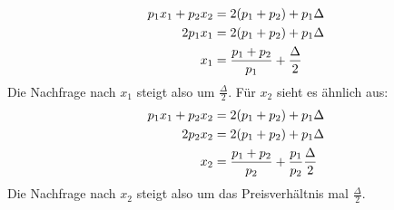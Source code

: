 \documentclass{article}
\begin{document}
\begin{enumerate}[label=(\alph*)]
		\begin{align}
			p_1x_1 + p_2x_2 &= 2(p_1+p_2) + p_1\Delta \notag \\
			2p_1x_1 &= 2(p_1+p_2) + p_1\Delta \notag \\
			x_1 &= \frac{p_1+p_2}{p_1} + \frac{\Delta}{2} \notag
		\end{align}
		Die Nachfrage nach $x_1$ steigt also um $\frac{\Delta}{2}$. Für $x_2$ sieht es ähnlich aus:
		\begin{align}
			p_1x_1 + p_2x_2 &= 2(p_1+p_2) + p_1\Delta \notag \\
			2p_2x_2 &= 2(p_1+p_2) + p_1\Delta \notag \\
			x_2 &= \frac{p_1+p_2}{p_2} + \frac{p_1}{p_2}\frac{\Delta}{2} \notag
		\end{align}
		Die Nachfrage nach $x_2$ steigt also um das Preisverhältnis mal $\frac{\Delta}{2}$.
	\end{enumerate}
\end{document}
